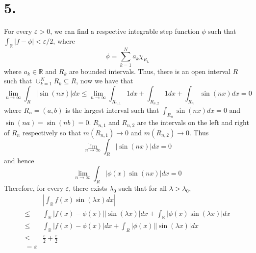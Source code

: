 \documentclass[11pt]{article}
\theoremstyle{mystyle}
\theoremstyle{definition}
\begin{document}
\section*{5.}
For every $\varepsilon > 0$, we can find a respective integrable step function $\phi$ such that $\int_\mathbb{R} |f - \phi| < \varepsilon/2$, where 
\[
  \phi = \sum_{k=1}^N a_k \chi_{R_k}
\]
where $a_k \in \mathbb{R}$ and $R_k$ are bounded intervals. Thus, there is an open interval $R$ such that $\cup_{k=1}^N R_k \subseteq R$, now we have that 
\[
  \lim_{n \to \infty} \int_R |\sin(nx) | dx \le \lim_{n \to \infty} \int_{R_{n,1}} 1 dx + \int_{R_{n,2}} 1 dx + \int_{R_n} \sin(nx) dx = 0 
\]
where $R_n = (a,b)$ is the largest interval such that $\int_{R_n} \sin(nx) dx = 0$ and $\sin(na) = \sin(nb) = 0$. $R_{n,1}$ and $R_{n,2}$ are the intervals on the left and right of $R_n$ respectively so that 
$m(R_{n,1}) \to 0$ and $m(R_{n,2}) \to 0$. Thus 
\[
  \lim_{n \to \infty} \int_R |\sin(nx) | dx = 0
\]
and hence 
\[
  \lim_{n \to \infty} \int_R |\phi(x) \sin(nx)| dx = 0
\]
Therefore, for every $\varepsilon$, there exists $\lambda_0$ such that for all $\lambda > \lambda_0$,  
\begin{align*}
  & \left|\int_\mathbb{R} f(x) \sin(\lambda x) dx \right| \\ 
  \le & \int_\mathbb{R} |f(x) - \phi(x)| |\sin(\lambda x)| dx + \int_\mathbb{R} |\phi(x) \sin(\lambda x)| dx \\
  \le & \int_\mathbb{R} |f(x) - \phi(x)| dx + \int_R |\phi(x)| |\sin(\lambda x)| dx \\
  \le & \displaystyle\frac{\varepsilon}{2} + \displaystyle\frac{\varepsilon}{2} \\
  = \varepsilon
\end{align*}
\end{document}
